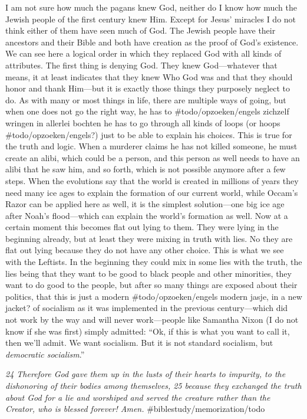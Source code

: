 I am not sure how much the pagans knew God, neither do I know how much
the Jewish people of the first century knew Him. Except for Jesus'
miracles I do not think either of them have seen much of God. The Jewish
people have their ancestors and their Bible and both have creation as
the proof of God's existence. We can see here a logical order in which
they replaced God with all kinds of attributes. The first thing is
denying God. They knew God---whatever that means, it at least indicates
that they knew Who God was and that they should honor and thank
Him---but it is exactly those things they purposely neglect to do. As
with many or most things in life, there are multiple ways of going, but
when one does not go the right way, he has to \#todo/opzoeken/engels
zichzelf wringen in allerlei bochten he has to go through all kinds of
loops (or hoops \#todo/opzoeken/engels?) just to be able to explain his
choices. This is true for the truth and logic. When a murderer claims he
has not killed someone, he must create an alibi, which could be a
person, and this person as well needs to have an alibi that he saw him,
and so forth, which is not possible anymore after a few steps. When the
evolutions say that the world is created in millions of years they need
many ice ages to explain the formation of our current world, while
Occam's Razor can be applied here as well, it is the simplest
solution---one big ice age after Noah's flood---which can explain the
world's formation as well. Now at a certain moment this becomes flat out
lying to them. They were lying in the beginning already, but at least
they were mixing in truth with lies. No they are flat out lying because
they do not have any other choice. This is what we see with the
Leftists. In the beginning they could mix in some lies with the truth,
the lies being that they want to be good to black people and other
minorities, they want to do good to the people, but after so many things
are exposed about their politics, that this is just a modern
\#todo/opzoeken/engels modern jasje, in a new jacket? of socialism as it
was implemented in the previous century---which did not work by the way
and will never work---people like Samantha Nixon (I do not know if she
was first) simply admitted: ``Ok, if this is what you want to call it,
then we'll admit. We want socialism. But it is not standard socialism,
but \emph{democratic socialism}.''

\emph{24 Therefore God gave them up in the lusts of their hearts to
impurity, to the dishonoring of their bodies among themselves, 25
because they exchanged the truth about God for a lie and worshiped and
served the creature rather than the Creator, who is blessed forever!
Amen.} \#biblestudy/memorization/todo

